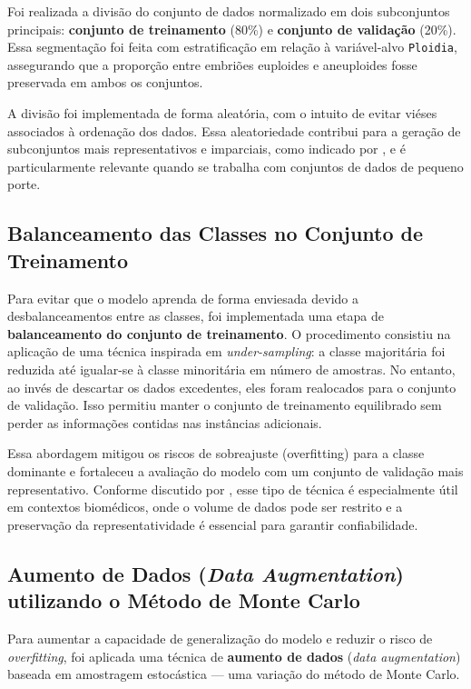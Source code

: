 Foi realizada a divisão do conjunto de dados normalizado em dois subconjuntos principais: \textbf{conjunto de treinamento} (80\%) e \textbf{conjunto de validação} (20\%). Essa segmentação foi feita com estratificação em relação à variável-alvo \texttt{Ploidia}, assegurando que a proporção entre embriões euploides e aneuploides fosse preservada em ambos os conjuntos.

A divisão foi implementada de forma aleatória, com o intuito de evitar viéses associados à ordenação dos dados. Essa aleatoriedade contribui para a geração de subconjuntos mais representativos e imparciais, como indicado por , e é particularmente relevante quando se trabalha com conjuntos de dados de pequeno porte.

\subsection*{Balanceamento das Classes no Conjunto de Treinamento}
Para evitar que o modelo aprenda de forma enviesada devido a desbalanceamentos entre as classes, foi implementada uma etapa de \textbf{balanceamento do conjunto de treinamento}. O procedimento consistiu na aplicação de uma técnica inspirada em \textit{under-sampling}: a classe majoritária foi reduzida até igualar-se à classe minoritária em número de amostras. No entanto, ao invés de descartar os dados excedentes, eles foram realocados para o conjunto de validação. Isso permitiu manter o conjunto de treinamento equilibrado sem perder as informações contidas nas instâncias adicionais.

Essa abordagem mitigou os riscos de sobreajuste (overfitting) para a classe dominante e fortaleceu a avaliação do modelo com um conjunto de validação mais representativo. Conforme discutido por , esse tipo de técnica é especialmente útil em contextos biomédicos, onde o volume de dados pode ser restrito e a preservação da representatividade é essencial para garantir confiabilidade. 

\subsection*{Aumento de Dados (\textit{Data Augmentation}) utilizando o Método de Monte Carlo} 
Para aumentar a capacidade de generalização do modelo e reduzir o risco de \textit{overfitting}, foi aplicada uma técnica de \textbf{aumento de dados} (\textit{data augmentation}) baseada em amostragem estocástica — uma variação do método de Monte Carlo.

